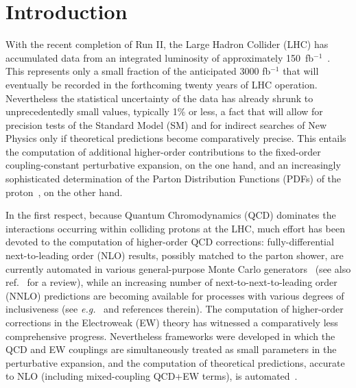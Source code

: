 \section{Introduction}
\label{sec:introduction}

With the recent completion of Run II, the Large Hadron Collider (LHC) has 
accumulated data from an integrated luminosity of approximately 
150~fb$^{-1}$~\cite{Mangano:2020icy}. This represents only a small fraction of 
the anticipated 3000 fb$^{-1}$ that will eventually be recorded in the 
forthcoming twenty years of LHC operation. Nevertheless the statistical 
uncertainty of the data has already shrunk to unprecedentedly small values,
typically 1\% or less, a fact that will allow for precision tests of the 
Standard Model (SM) and for indirect searches of New Physics only if 
theoretical predictions become comparatively precise. This entails the 
computation of additional higher-order contributions to the fixed-order 
coupling-constant perturbative expansion, on the one hand, and an increasingly 
sophisticated determination of the Parton Distribution Functions (PDFs) of the 
proton~\cite{Gao:2017yyd}, on the other hand. 

In the first respect, because Quantum Chromodynamics (QCD) dominates the 
interactions occurring within colliding protons at the LHC, much effort 
has been devoted to the computation of higher-order QCD corrections: 
fully-differential next-to-leading order (NLO) results, possibly matched to the
parton shower, are currently automated in various general-purpose
Monte Carlo generators~\cite{Gleisberg:2008ta,Alwall:2014hca,Bellm:2015jjp}
(see also ref.~\cite{Buckley:2011ms} for a review),
while an increasing number of next-to-next-to-leading order (NNLO) predictions 
are becoming available for processes with various degrees of inclusiveness
(see {\it e.g.}~\cite{Amoroso:2020lgh} and references therein). The computation
of higher-order corrections in the Electroweak (EW) theory has 
witnessed a comparatively less comprehensive progress. Nevertheless frameworks 
were developed in which the QCD and EW couplings are simultaneously treated as 
small parameters in the perturbative expansion, and the computation of 
theoretical predictions, accurate to NLO (including mixed-coupling QCD+EW 
terms), is automated~\cite{Biedermann:2017yoi,Frederix:2018nkq}.

